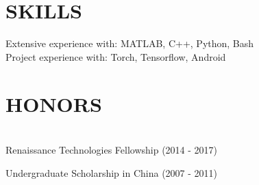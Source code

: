 \documentclass[margin, 11pt]{res} %
\begin{document}
\begin{resume}
\section{SKILLS}
Extensive experience with: MATLAB, C++, Python, Bash\\
Project experience with: Torch, Tensorflow, Android 
 
\section{HONORS}
~\\
Renaissance Technologies Fellowship (2014 - 2017)

Undergraduate Scholarship in China  (2007 - 2011)   

\end{resume}
\end{document}
